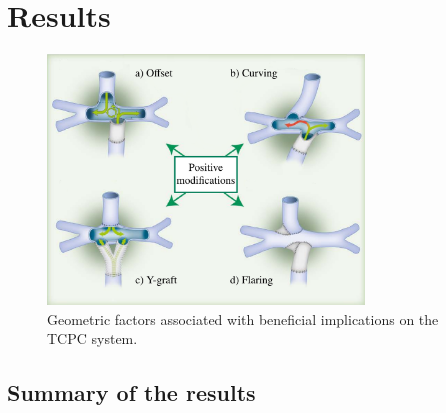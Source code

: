 \chapter{Results}\label{results}

\begin{figure}[H]
	\vspace{5mm}
	\centering
	\includegraphics[width=0.75\textwidth]{figures/energyloss-en.pdf}
	\vspace{5mm}
	\caption{Geometric factors associated with beneficial implications on the TCPC system.}
	\label{fig:modifications}
	
\end{figure}





\section{Summary of the results}